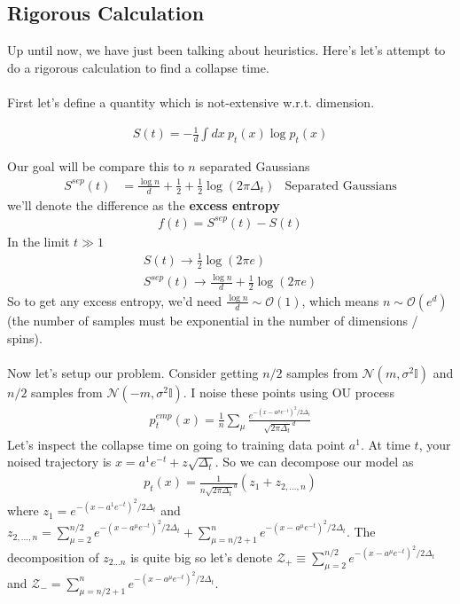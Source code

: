 \subsection{Rigorous Calculation}
Up until now, we have just been talking about heuristics. Here's let's attempt to do a rigorous calculation to find a collapse time.\\
\\
First let's define a quantity which is not-extensive w.r.t. dimension.
\begin{definition}
	\begin{align}
		S(t) = - \frac{1}{d} \int dx ~ p_t(x) \log p_t(x)
	\end{align}
\end{definition}
Our goal will be compare this to $n$ separated Gaussians
\begin{align}
	S^{sep}(t) & = \frac{\log n}{d} + \frac{1}{2} + \frac{1}{2} \log (2\pi \Delta_t) & \text{Separated Gaussians}
\end{align}
we'll denote the difference as the \textbf{excess entropy}
\begin{align}
	f(t) = S^{sep}(t) - S(t)
\end{align}
In the limit $t \gg 1$
\begin{align}
	S(t) \to \frac{1}{2}\log (2\pi e)\\
	S^{sep}(t) \to \frac{\log n}{d} + \frac{1}{2} \log (2\pi e)
\end{align}
So to get any excess entropy, we'd need $\frac{\log n}{d} \sim \mathcal O(1)$, which means $n \sim \mathcal O(e^d)$ (the number of samples must be exponential in the number of dimensions / spins).
\\
\\
Now let's setup our problem. Consider getting $n/2$ samples from $\mathcal N(m, \sigma^2 \mathbb I)$ and $n/2$ samples from $\mathcal N(-m, \sigma^2 \mathbb I)$. I noise these points using OU process
\begin{align}
	p_t^{emp}(x) = \frac{1}{n} \sum_\mu \frac{e^{-(x-a^\mu e^{-t})^2/2\Delta_t}}{\sqrt{2\pi \Delta_t}^d}
\end{align}
Let's inspect the collapse time on going to training data point $a^1$. At time $t$, your noised trajectory is $x = a^1 e^{-t} + z \sqrt{\Delta_t}$. So we can decompose our model as
\begin{align}
	p_t(x) = \frac{1}{n\sqrt{2\pi \Delta_t}^d} (z_1 + z_{2, ..., n})
\end{align}
where $z_1 = e^{-(x - a^1 e^{-t})^2/2\Delta_t}$ and $z_{2, ..., n} = \sum_{\mu=2}^{n/2} e^{-(x - a^\mu e^{-t})^2/2\Delta_t} + \sum_{\mu = n/2 + 1}^n e^{-(x - a^\mu e^{-t})^2/2\Delta_t}$. The decomposition of $z_{2...n}$ is quite big so let's denote $\mathcal Z_+ \equiv \sum_{\mu=2}^{n/2} e^{-(x - a^\mu e^{-t})^2/2\Delta_t}$ and $\mathcal Z_{-} = \sum_{\mu = n/2 + 1}^n e^{-(x - a^\mu e^{-t})^2/2\Delta_t}$.\\
